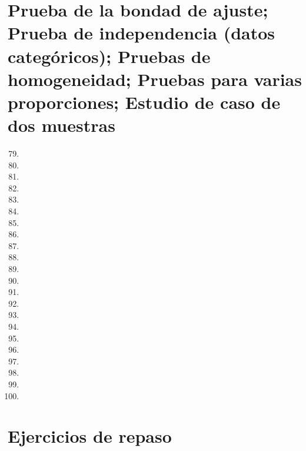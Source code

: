 \documentclass[a4paper,11pt]{article}
\theoremstyle{teoremas}
\theoremstyle{ejemplos}
\theoremstyle{definiciones}
\theoremstyle{lemas}
\begin{document}
\newpage

\section{Prueba de la bondad de ajuste; Prueba de independencia (datos categ\'oricos); Pruebas de homogeneidad; Pruebas para varias proporciones; Estudio de caso de dos muestras}

\begin{enumerate}
 \setcounter{enumi}{78}
 \item 
 \item 
 \newpage
 \item 
 \item 
 \newpage
 \item 
 \item 
 \item 
 \item 
 \item 
 \item 
 \item 
 \item 
 \item 
 \item 
 \item 
 \item 
 \item 
 \item 
 \item 
 \item 
 \item 
 \item 
\end{enumerate}

\newpage

\section{Ejercicios de repaso}
\end{document}
